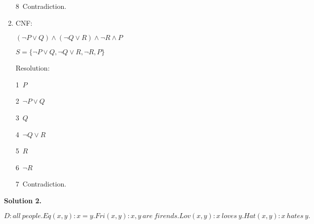 \documentclass[10pt]{article}
\begin{document}
\begin{enumerate}
	\normalsize{\textcircled{\footnotesize{8}}}~Contradiction.

	\vspace{-5pt}
	\item
	CNF:

	\centerline{$(\neg P\vee Q)\wedge (\neg Q\vee R)\wedge \neg R \wedge P$}

	\centerline{$S=\{\neg P\vee Q,\neg Q\vee R, \neg R, P\}$}

	Resolution:

	\normalsize{\textcircled{\footnotesize{1}}}~$P$

	\normalsize{\textcircled{\footnotesize{2}}}~$\neg P \vee Q$

	\normalsize{\textcircled{\footnotesize{3}}}~$Q$

	\normalsize{\textcircled{\footnotesize{4}}}~$\neg Q\vee R$

	\normalsize{\textcircled{\footnotesize{5}}}~$R$

	\normalsize{\textcircled{\footnotesize{6}}}~$\neg R$

	\normalsize{\textcircled{\footnotesize{7}}}~Contradiction.
\end{enumerate}

\noindent\textbf{Solution 2.}

$D:all~people.Eq(x,y):x=y.Fri(x,y):x, y~are~firends.Lov(x,y):x~loves~y.Hat(x,y):x~hates~y.$
\end{document}
